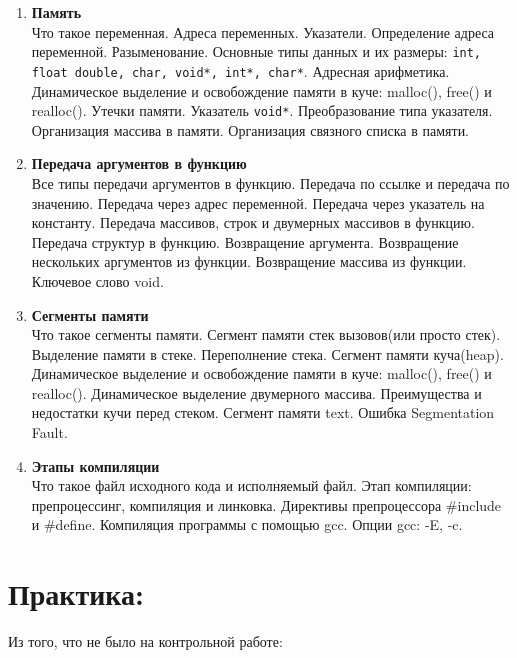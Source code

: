 \documentclass{article}
\begin{document}
\begin{enumerate}
\item \textbf{Память}\\
Что такое переменная. Адреса переменных. Указатели. Определение адреса переменной. Разыменование. Основные типы данных и их размеры: \texttt{int, float double, char, void*, int*, char*}. Адресная арифметика. Динамическое выделение и освобождение памяти в куче: malloc(), free() и realloc(). Утечки памяти. Указатель \texttt{void*}. Преобразование типа указателя. Организация массива в памяти. Организация связного списка в памяти.\\

\item \textbf{Передача аргументов в функцию}\\
Все типы передачи аргументов в функцию. Передача по ссылке и передача по значению. Передача через адрес переменной. Передача через указатель на константу. Передача массивов, строк и двумерных массивов в функцию. Передача структур в функцию. Возвращение аргумента. Возвращение нескольких аргументов из функции. Возвращение массива из функции. Ключевое слово void.\\

\item \textbf{Сегменты памяти}\\
Что такое сегменты памяти. Сегмент памяти стек вызовов(или просто стек). Выделение памяти в стеке. Переполнение стека. Сегмент памяти куча(heap). Динамическое выделение и освобождение памяти в куче: malloc(), free() и realloc(). Динамическое выделение двумерного массива. Преимущества и недостатки кучи перед стеком. Сегмент памяти text. Ошибка Segmentation Fault.\\

\item \textbf{Этапы компиляции}\\
Что такое файл исходного кода и исполняемый файл. Этап компиляции: препроцессинг, компиляция и линковка. Директивы препроцессора \#include и \#define. Компиляция программы с помощью gcc. Опции gcc: -E, -c.

\end{enumerate}



\newpage
\section*{Практика:}
Из того, что не было на контрольной работе:
\end{document}
